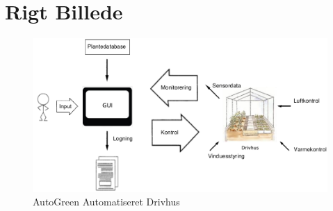 \section{Rigt Billede}
\begin{figure}[h]
\centering 
\includegraphics[width={\textwidth}] {../fig/Rigt_Billede.pdf}
\caption{AutoGreen Automatiseret Drivhus}
\label{fig:Rigt_Billede}
\end{figure}
